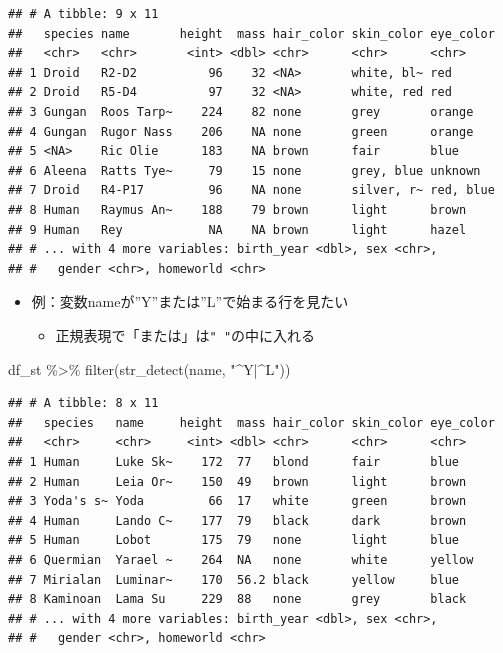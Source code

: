 \documentclass[
  xelatex,ja=standard, b5paper]{bxjsbook}
\newenvironment{Shaded}{\begin{snugshade}}{\end{snugshade}}
\newcommand{\FunctionTok}[1]{\textcolor[rgb]{0.00,0.00,0.00}{#1}}
\newcommand{\NormalTok}[1]{#1}
\newcommand{\SpecialCharTok}[1]{\textcolor[rgb]{0.00,0.00,0.00}{#1}}
\newcommand{\StringTok}[1]{\textcolor[rgb]{0.31,0.60,0.02}{#1}}
\providecommand{\tightlist}{%
  \setlength{\itemsep}{0pt}\setlength{\parskip}{0pt}}
\begin{document}
\begin{verbatim}
## # A tibble: 9 x 11
##   species name       height  mass hair_color skin_color eye_color
##   <chr>   <chr>       <int> <dbl> <chr>      <chr>      <chr>    
## 1 Droid   R2-D2          96    32 <NA>       white, bl~ red      
## 2 Droid   R5-D4          97    32 <NA>       white, red red      
## 3 Gungan  Roos Tarp~    224    82 none       grey       orange   
## 4 Gungan  Rugor Nass    206    NA none       green      orange   
## 5 <NA>    Ric Olie      183    NA brown      fair       blue     
## 6 Aleena  Ratts Tye~     79    15 none       grey, blue unknown  
## 7 Droid   R4-P17         96    NA none       silver, r~ red, blue
## 8 Human   Raymus An~    188    79 brown      light      brown    
## 9 Human   Rey            NA    NA brown      light      hazel    
## # ... with 4 more variables: birth_year <dbl>, sex <chr>,
## #   gender <chr>, homeworld <chr>
\end{verbatim}

\begin{itemize}
\tightlist
\item
  例：変数nameが''Y''または''L''で始まる行を見たい

  \begin{itemize}
  \tightlist
  \item
    正規表現で「または」は\texttt{"\ "}の中に入れる
  \end{itemize}
\end{itemize}

\begin{Shaded}
\begin{Highlighting}[]
\NormalTok{df\_st }\SpecialCharTok{\%\textgreater{}\%}
  \FunctionTok{filter}\NormalTok{(}\FunctionTok{str\_detect}\NormalTok{(name, }\StringTok{"\^{}Y|\^{}L"}\NormalTok{))}
\end{Highlighting}
\end{Shaded}

\begin{verbatim}
## # A tibble: 8 x 11
##   species   name     height  mass hair_color skin_color eye_color
##   <chr>     <chr>     <int> <dbl> <chr>      <chr>      <chr>    
## 1 Human     Luke Sk~    172  77   blond      fair       blue     
## 2 Human     Leia Or~    150  49   brown      light      brown    
## 3 Yoda's s~ Yoda         66  17   white      green      brown    
## 4 Human     Lando C~    177  79   black      dark       brown    
## 5 Human     Lobot       175  79   none       light      blue     
## 6 Quermian  Yarael ~    264  NA   none       white      yellow   
## 7 Mirialan  Luminar~    170  56.2 black      yellow     blue     
## 8 Kaminoan  Lama Su     229  88   none       grey       black    
## # ... with 4 more variables: birth_year <dbl>, sex <chr>,
## #   gender <chr>, homeworld <chr>
\end{verbatim}
\end{document}
